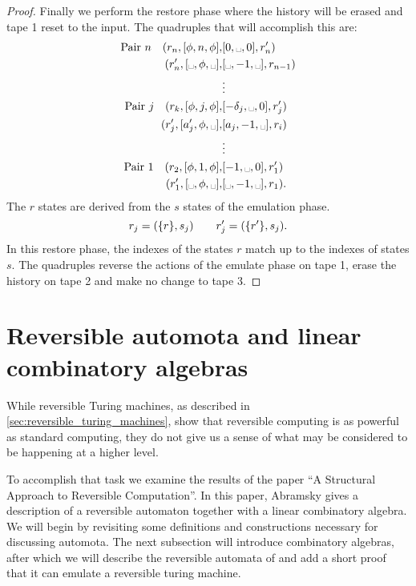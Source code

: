 \begin{proof}
  Finally we perform the restore phase where the history will be erased and tape 1 reset to
  the input. The quadruples that will accomplish this are:
  \begin{align*}
      \text{Pair }n \quad (r_n,[\phi,n,\phi],&[0,\blank,0],r'_n)\\
      (r'_n,[\blank,\phi,\blank],&[\blank,-1,\blank],r_{n-1})\\
      &\vdots\\
      \text{Pair }\jay \quad (r_\kay,[\phi,\jay,\phi],&[-\delta_\jay,\blank,0],r'_\jay)\\
      (r'_\jay,[a'_\jay,\phi,\blank],&[a_\jay,-1,\blank],r_i)\\
      &\vdots\\
      \text{Pair 1} \quad (r_2,[\phi,1,\phi],&[-1,\blank,0],r'_1)\\
      (r'_1,[\blank,\phi,\blank],&[\blank,-1,\blank],r_1).
  \end{align*}
  The $r$ states are derived from the $s$ states of the emulation phase.
  \[
    r_j = (\{r\},s_j) \qquad    r'_j = (\{r'\}, s_j).
  \]
  In this restore phase, the indexes of the states $r$ match up to the indexes of states $s$. The
  quadruples reverse the actions of the emulate phase on tape 1, erase the history on tape 2 and
  make no change to tape 3.

\end{proof}



\section{Reversible automota and linear combinatory algebras} %
\label{sec:reversible_automota_and_linear_combinatory_algebras}
While reversible Turing machines, as described in \vref{sec:reversible_turing_machines},
show that reversible computing is as powerful as standard computing, they do not 
give us a sense of what may be considered to be happening at a higher level. 

To accomplish that task we examine the results of the paper 
``A Structural Approach to Reversible Computation''\cite{abramsky05:reversible}. In this paper,
Abramsky gives a description of a reversible automaton together with a linear combinatory 
algebra. We will begin by revisiting some definitions and constructions necessary for 
discussing automota. The next subsection will introduce combinatory algebras, after which we will
describe the reversible automata of \cite{abramsky05:reversible} and add a short proof that 
it can emulate a reversible turing machine.


